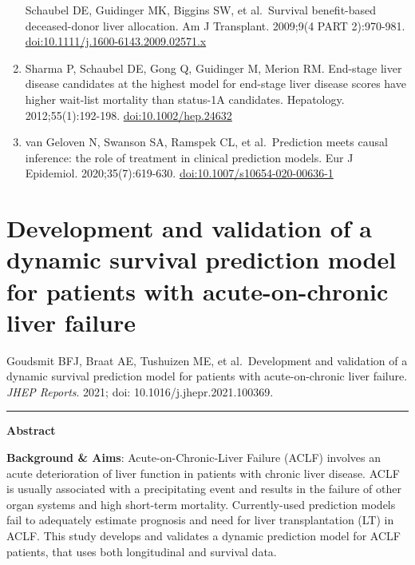 \documentclass[11pt,english,]{book} %
\begin{document}
\begin{enumerate}
  Schaubel DE, Guidinger MK, Biggins SW, et al.~Survival benefit-based deceased-donor liver allocation. Am J Transplant. 2009;9(4 PART 2):970-981. \url{doi:10.1111/j.1600-6143.2009.02571.x}
\item
  Sharma P, Schaubel DE, Gong Q, Guidinger M, Merion RM. End-stage liver disease candidates at the highest model for end-stage liver disease scores have higher wait-list mortality than status-1A candidates. Hepatology. 2012;55(1):192-198. \url{doi:10.1002/hep.24632}
\item
  van Geloven N, Swanson SA, Ramspek CL, et al.~Prediction meets causal inference: the role of treatment in clinical prediction models. Eur J Epidemiol. 2020;35(7):619-630. \url{doi:10.1007/s10654-020-00636-1}
\end{enumerate}

\newpage
\linespread{1.213}
\normalsize
\thispagestyle{plain}

\mbox{}

\pagecolor{black}
\color{white}

\hypertarget{chap-aclfjm}{%
\chapter{Development and validation of a dynamic survival prediction model for patients with acute-on-chronic liver failure}\label{chap-aclfjm}}


\vspace*{\fill}

\noindent Goudsmit BFJ, Braat AE, Tushuizen ME, et al.~Development and validation of a dynamic survival prediction model for patients with acute-on-chronic liver failure. \emph{JHEP Reports}. 2021; doi: 10.1016/j.jhepr.2021.100369.

\begin{center}\rule{0.5\linewidth}{0.5pt}\end{center}

\newpage

\noindent
\nopagecolor
\color{black}
\small

\textbf{Abstract}

\textbf{Background \& Aims}: Acute-on-Chronic-Liver Failure (ACLF) involves an acute deterioration of liver function in patients with chronic liver disease. ACLF is usually associated with a precipitating event and results in the failure of other organ systems and high short-term mortality. Currently-used prediction models fail to adequately estimate prognosis and need for liver transplantation (LT) in ACLF. This study develops and validates a dynamic prediction model for ACLF patients, that uses both longitudinal and survival data.
\end{document}
